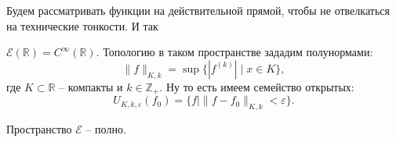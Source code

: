 Будем рассматривать функции на действительной прямой, чтобы не отвелкаться на технические тонкости. И так
\begin{to_def}
	$\mathcal{E}(\mathbb{R}) = C^{\infty}(\mathbb{R})$. Топологию в таком пространстве зададим полунормами:
	\begin{equation*}
		\|f\|_{K,k} = \sup \{ |f^{(k)}| \mid x \in K\},
	\end{equation*}
	где $K \subset \mathbb{R}$ -- компакты и $k \in \mathbb{Z}_+$. Ну то есть имеем семейство открытых:
	\begin{equation*}
		U_{K,k,\varepsilon} (f_0) = \{f \mid \|f - f_0\|_{K,k} < \varepsilon\}.
	\end{equation*}
\end{to_def}

\begin{to_thr}
	Пространство $\mathcal{E}$ -- полно.
\end{to_thr}

